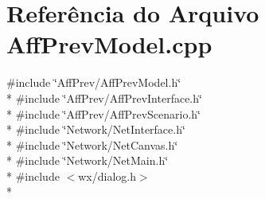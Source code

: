 \section{Referência do Arquivo Aff\+Prev\+Model.\+cpp}
\label{_aff_prev_model_8cpp}
{\ttfamily \#include \char`\"{}Aff\+Prev/\+Aff\+Prev\+Model.\+h\char`\"{}}\\*
{\ttfamily \#include \char`\"{}Aff\+Prev/\+Aff\+Prev\+Interface.\+h\char`\"{}}\\*
{\ttfamily \#include \char`\"{}Aff\+Prev/\+Aff\+Prev\+Scenario.\+h\char`\"{}}\\*
{\ttfamily \#include \char`\"{}Network/\+Net\+Interface.\+h\char`\"{}}\\*
{\ttfamily \#include \char`\"{}Network/\+Net\+Canvas.\+h\char`\"{}}\\*
{\ttfamily \#include \char`\"{}Network/\+Net\+Main.\+h\char`\"{}}\\*
{\ttfamily \#include $<$wx/dialog.\+h$>$}\\*
